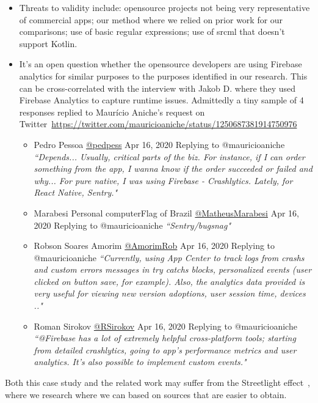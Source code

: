 \begin{itemize}
    \item Threats to validity include: opensource projects not being very representative of commercial apps; our method where we relied on prior work for our comparisons; use of basic regular expressions; use of srcml that doesn't support Kotlin.
    \item It's an open question whether the opensource developers are using Firebase analytics for similar purposes to the purposes identified in our research. This can be cross-correlated with the interview with Jakob D. where they used Firebase Analytics to capture runtime issues. Admittedly a tiny sample of 4 responses replied to Maurício Aniche's request on Twitter~\url{https://twitter.com/mauricioaniche/status/1250687381914750976} %
    \begin{itemize}
        \item Pedro Pessoa \href{https://twitter.com/pedpess}{@pedpess} Apr 16, 2020 Replying to @mauricioaniche \emph{``Depends... Usually, critical parts of the biz. For instance, if I can order something from the app, I wanna know if the order succeeded or failed and why... For pure native, I was using Firebase - Crashlytics. Lately, for React Native, Sentry."}
        \item Marabesi Personal computerFlag of Brazil \href{https://twitter.com/MatheusMarabesi}{@MatheusMarabesi} Apr 16, 2020 Replying to @mauricioaniche \emph{``Sentry/bugsnag"}
        \item Robson Soares Amorim \href{https://twitter.com/AmorimRob}{@AmorimRob} Apr 16, 2020 Replying to  @mauricioaniche \emph{``Currently, using App Center to track logs from crashs and custom errors messages in try catchs blocks, personalized events (user clicked on button save, for example). Also, the analytics data provided is very useful for viewing new version adoptions, user session time, devices .."}
        \item Roman Sirokov \href{https://twitter.com/RSirokov}{@RSirokov} Apr 16, 2020 Replying to  @mauricioaniche \emph{``@Firebase has a lot of extremely helpful cross-platform tools; starting from detailed crashlytics, going to app’s performance metrics and user analytics. It’s also possible to implement custom events."}
    \end{itemize}
\end{itemize}

Both this case study and the related work may suffer from the Streetlight effect~\citep{wikipedia_streetlight_effect}, where we research where we can based on sources that are easier to obtain.

